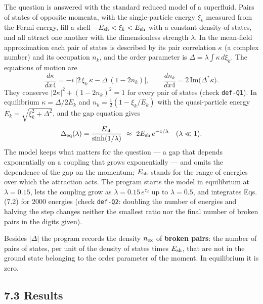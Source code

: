 \documentclass[
  10pt,
]{article}
\begin{document}
The question is answered with the standard reduced model of a
superfluid. Pairs of states of opposite momenta, with the
single-particle energy \(\xi_k\) measured from the Fermi energy, fill a
shell \(-E_{\rm sh}<\xi_k<E_{\rm sh}\) with a constant density of
states, and all attract one another with the dimensionless strength
\(\lambda\). In the mean-field approximation each pair of states is
described by its pair correlation \(\kappa\) (a complex number) and its
occupation \(n_k\), and the order parameter is
\(\Delta=\lambda\int\kappa\,d\xi_k\). The equations of motion are
\[\frac{d\kappa}{dx4}=-i\,\big[2\,\xi_k\,\kappa-\Delta\,(1-2n_k)\big],\qquad
\frac{dn_k}{dx4}=2\,\mathrm{Im}\big(\Delta^*\kappa\big) .\tag{7.2}\]
They conserve \(\lvert2\kappa\rvert^2+(1-2n_k)^2=1\) for every pair of
states (check \texttt{def-Q1}). In equilibrium \(\kappa=\Delta/2E_k\)
and \(n_k=\tfrac12(1-\xi_k/E_k)\) with the quasi-particle energy
\(E_k=\sqrt{\xi_k^2+\Delta^2}\), and the gap equation gives
\[\Delta_{\rm eq}(\lambda)=\frac{E_{\rm sh}}{\sinh(1/\lambda)}\ \approx\ 2E_{\rm sh}\,e^{-1/\lambda}\quad(\lambda\ll1).\]
The model keeps what matters for the question --- a gap that depends
exponentially on a coupling that grows exponentially --- and omits the
dependence of the gap on the momentum; \(E_{\rm sh}\) stands for the
range of energies over which the attraction acts. The program starts the
model in equilibrium at \(\lambda=0.15\), lets the coupling grow as
\(\lambda=0.15\,e^{\tau_d}\) up to \(\lambda=0.5\), and integrates Eqs.
(7.2) for 2000 energies (check \texttt{def-Q2}: doubling the number of
energies and halving the step changes neither the smallest ratio nor the
final number of broken pairs in the digits given).

Besides \(\lvert\Delta\rvert\) the program records the density
\(n_{\rm ex}\) of \textbf{broken pairs}: the number of pairs of states,
per unit of the density of states times \(E_{\rm sh}\), that are not in
the ground state belonging to the order parameter of the moment. In
equilibrium it is zero.

\hypertarget{results}{%
\subsection{7.3 Results}\label{results}}
\end{document}
